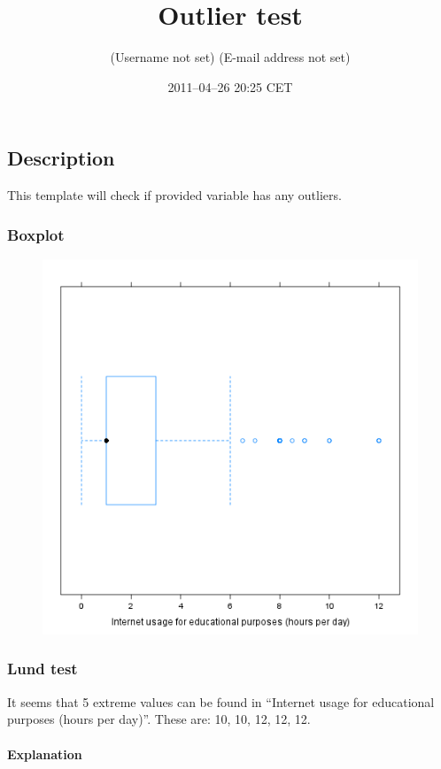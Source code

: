 \documentclass{article}
\title{Outlier test}
\author{(Username not set) (E-mail address not set)}
\date{2011--04--26 20:25 CET}
\makeatletter
\def\maxwidth{\ifdim\Gin@nat@width>\linewidth\linewidth
\else\Gin@nat@width\fi}
\let\Oldincludegraphics\includegraphics
\renewcommand{\includegraphics}[1]{\Oldincludegraphics[width=\maxwidth]{#1}}
\makeatother
\begin{document}
\maketitle

\subsection{Description}

This template will check if provided variable has any outliers.

\subsubsection{Boxplot}

\begin{figure}[htbp]
\centering
\includegraphics{7e4826ae32ce6332453510e91fb95335.png}
\caption{}
\end{figure}

\subsubsection{Lund test}

It seems that 5 extreme values can be found in ``Internet usage for
educational purposes (hours per day)''. These are: 10, 10, 12, 12, 12.

\paragraph{Explanation}
\end{document}
